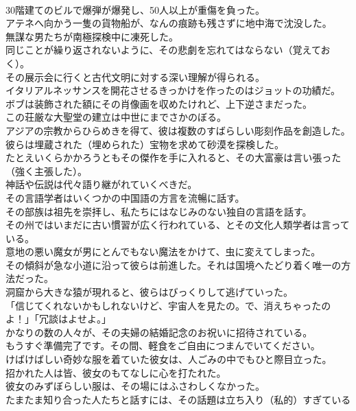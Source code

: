 \documentclass[8pt]{extreport}
\begin{document}
\begin{CJK}{UTF8}{min}
\\	30階建てのビルで爆弾が爆発し、50人以上が重傷を負った。
\\	アテネへ向かう一隻の貨物船が、なんの痕跡も残さずに地中海で沈没した。
\\	無謀な男たちが南極探検中に凍死した。
\\	同じことが繰り返されないように、その悲劇を忘れてはならない（覚えておく）。
\\	その展示会に行くと古代文明に対する深い理解が得られる。
\\	イタリアルネッサンスを開花させるきっかけを作ったのはジョットの功績だ。
\\	ボブは装飾された額にその肖像画を収めたけれど、上下逆さまだった。
\\	この荘厳な大聖堂の建立は中世にまでさかのぼる。
\\	アジアの宗教からひらめきを得て、彼は複数のすばらしい彫刻作品を創造した。
\\	彼らは埋蔵された（埋められた）宝物を求めて砂漠を探検した。
\\	たとえいくらかかろうともその傑作を手に入れると、その大富豪は言い張った（強く主張した）。
\\	神話や伝説は代々語り継がれていくべきだ。
\\	その言語学者はいくつかの中国語の方言を流暢に話す。
\\	その部族は祖先を崇拝し、私たちにはなじみのない独自の言語を話す。
\\	その州ではいまだに古い慣習が広く行われている、とその文化人類学者は言っている。
\\	意地の悪い魔女が男にとんでもない魔法をかけて、虫に変えてしまった。
\\	その傾斜が急な小道に沿って彼らは前進した。それは国境へたどり着く唯一の方法だった。
\\	洞窟から大きな猿が現れると、彼らはびっくりして逃げていった。
\\	「信じてくれないかもしれないけど、宇宙人を見たの。で、消えちゃったのよ！」「冗談はよせよ。」
\\	かなりの数の人々が、その夫婦の結婚記念のお祝いに招待されている。
\\	もうすぐ準備完了です。その間、軽食をご自由につまんでいてください。
\\	けばけばしい奇妙な服を着ていた彼女は、人ごみの中でもひと際目立った。
\\	招かれた人は皆、彼女のもてなしに心を打たれた。
\\	彼女のみずぼらしい服は、その場にはふさわしくなかった。
\\	たまたま知り合った人たちと話すには、その話題は立ち入り（私的）すぎている

\end{CJK}
\end{document}
